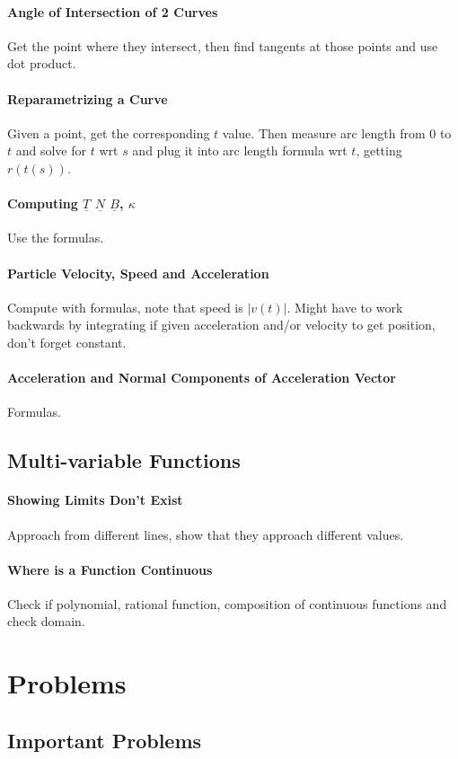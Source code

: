 \documentclass[12 pt]{article}
\theoremstyle{definition}
\begin{document}
\paragraph{Angle of Intersection of 2 Curves} Get the point where they intersect, then find tangents at those points and use dot product.
\paragraph{Reparametrizing a Curve} Given a point, get the corresponding $t$ value. Then measure arc length from $0$ to $t$ and solve for $t$ wrt $s$ and plug it into arc length formula wrt $t$, getting $r(t(s))$.
\paragraph{Computing $\underline{T}$ $\underline{N}$ $\underline{B}$, $\kappa$} Use the formulas.
\paragraph{Particle Velocity, Speed and Acceleration} Compute with formulas, note that speed is $|v(t)|$. Might have to work backwards by integrating if given acceleration and/or velocity to get position, don't forget constant.
\paragraph{Acceleration and Normal Components of Acceleration Vector} Formulas.
\subsection{Multi-variable Functions}
\paragraph{Showing Limits Don't Exist} Approach from different lines, show that they approach different values.
\paragraph{Where is a Function Continuous} Check if polynomial, rational function, composition of continuous functions and check domain.
\section{Problems}
\subsection{Important Problems}
\end{document}
